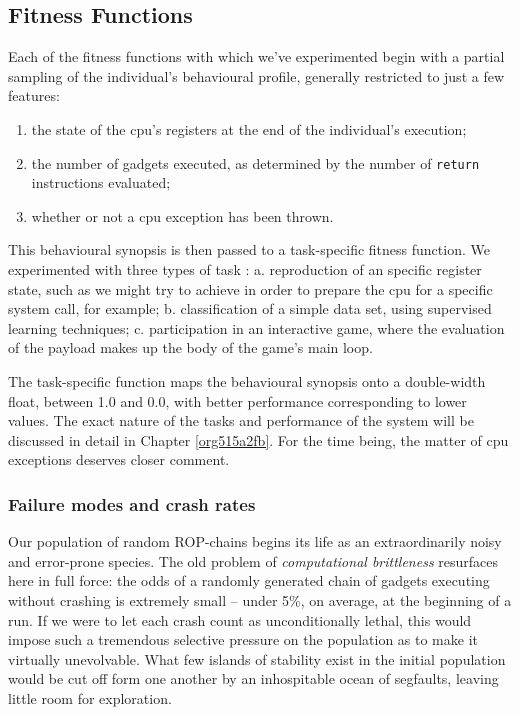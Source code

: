 \documentclass[12pt,glossary]{dalthesis}
\begin{document}
\subsection{Fitness Functions}
\label{sec:org02cc86f}
\label{org796c65b}

Each of the fitness functions with which we've experimented begin with a partial
sampling of the individual's behavioural profile, generally restricted to just
a few features:
\begin{enumerate}
\item the state of the \gls{cpu}'s registers at the end of the individual's execution;
\item the number of gadgets executed, as determined by the number of \texttt{return}
instructions evaluated;
\item whether or not a \gls{cpu} exception has been thrown.
\end{enumerate}

This behavioural synopsis is then passed to a task-specific fitness function. We
experimented with three types of task : 
  a. reproduction of an specific register state, such as we might try to achieve
     in order to prepare the \gls{cpu} for a specific system call, for example;
  b. classification of a simple data set, using supervised learning techniques;
  c. participation in an interactive game, where the evaluation of the payload
     makes up the body of the game's main loop.

The task-specific function maps the behavioural synopsis onto a double-width float,
between 1.0 and 0.0, with better performance corresponding to lower values. 
The exact nature of the tasks and performance of the system will be discussed in
detail in Chapter \ref{org515a2fb}. For the time being, the matter of \gls{cpu}
exceptions deserves closer comment.

\subsubsection{Failure modes and crash rates}
\label{sec:org97bfeb4}

Our population of random ROP-chains begins its life as an extraordinarily noisy
and error-prone species. The old problem of \emph{computational brittleness}  resurfaces here in full force: the odds of a
randomly generated chain of gadgets executing without crashing is extremely
small  -- under 5\%, on average, at the
beginning of a run.  If we were to let each crash count as unconditionally
lethal, this would impose such a tremendous selective pressure on the population
as to make it virtually unevolvable. What few islands of stability exist in the
initial population would be cut off form one another by an inhospitable ocean of
segfaults, leaving little room for exploration.
\end{document}
